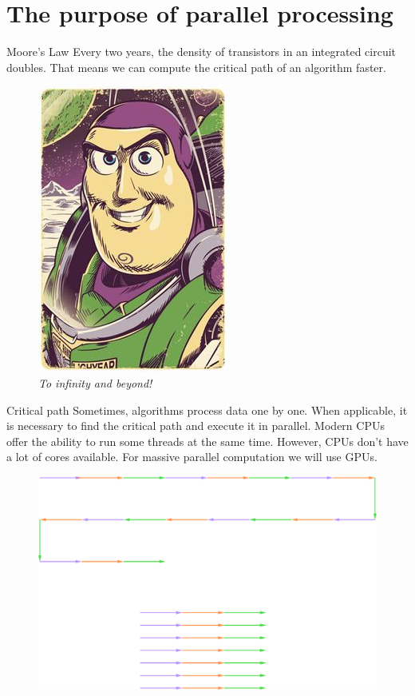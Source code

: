 \documentclass{beamer}
\begin{document}
\section{The purpose of parallel processing}
\begin{frame}{Moore's Law}
	Every two years, the density of transistors in an integrated circuit doubles. That means we can compute the critical path of an algorithm faster.
	\begin{figure}
		\includegraphics[scale=0.2]{figures/buzz1.jpg}
		\caption{\textit{To infinity and beyond!}}
	\end{figure}
\end{frame}

\begin{frame}{Critical path}
	Sometimes, algorithms process data one by one. When applicable, it is necessary to find the critical path and execute it in parallel. Modern CPUs offer the ability to run some threads at the same time. However, CPUs don't have a lot of cores available. For massive parallel computation we will use GPUs.
	\begin{figure}
		\includegraphics[scale=0.2]{figures/criticalPath.pdf}
	\end{figure}
\end{frame}
\end{document}
